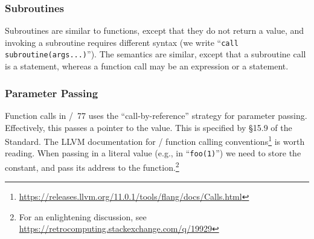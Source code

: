 \subsubsection{Subroutines}
Subroutines are similar to functions, except that they do not return a
value, and invoking a subroutine requires different syntax (we write
``\texttt{call subroutine(args...)}''). The semantics are similar,
except that a subroutine call is a statement, whereas a function call
may be an expression or a statement.

\subsubsection{Parameter Passing}
Function calls in \FORTRAN/~77 uses the ``call-by-reference'' strategy
for parameter passing. Effectively, this passes a pointer to the value.
This is specified by \S15.9 of the Standard. The LLVM documentation for
\FORTRAN/ function calling
conventions\footnote{\url{https://releases.llvm.org/11.0.1/tools/flang/docs/Calls.html}}
is worth reading. When passing in a literal value (e.g., in ``\texttt{foo(1)}'')
we need to store the constant, and pass its address to the
function.\footnote{For an enlightening discussion, see \url{https://retrocomputing.stackexchange.com/q/19929}}

